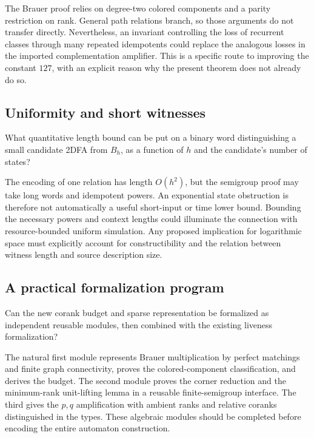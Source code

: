 The Brauer proof relies on degree-two colored components
and a parity restriction on rank. General path relations
branch, so those arguments do not transfer directly.
Nevertheless, an invariant controlling the loss of
recurrent classes through many repeated idempotents could
replace the analogous losses in the imported
complementation amplifier. This is a specific route to
improving the constant $127$, with an explicit reason why
the present theorem does not already do so.

\subsection{Uniformity and short witnesses}

\begin{question}
What quantitative length bound can be put on a binary word
distinguishing a small candidate 2DFA from $B_h$, as a
function of $h$ and the candidate's number of states?
\end{question}

The encoding of one relation has length $O(h^2)$, but the
semigroup proof may take long words and idempotent powers.
An exponential state obstruction is therefore not automatically
a useful short-input or time lower bound. Bounding the
necessary powers and context lengths could illuminate the
connection with resource-bounded uniform simulation.
Any proposed implication for logarithmic space must explicitly
account for constructibility and the relation between witness
length and source description size.

\subsection{A practical formalization program}

\begin{question}
Can the new corank budget and sparse representation be
formalized as independent reusable modules, then combined
with the existing liveness formalization?
\end{question}

The natural first module represents Brauer multiplication
by perfect matchings and finite graph connectivity, proves
the colored-component classification, and derives the budget.
The second module proves the corner reduction and the
minimum-rank unit-lifting lemma in a reusable finite-semigroup
interface. The third gives the $p,q$ amplification with
ambient ranks and relative coranks distinguished in the types.
These algebraic modules should be completed before encoding
the entire automaton construction.

